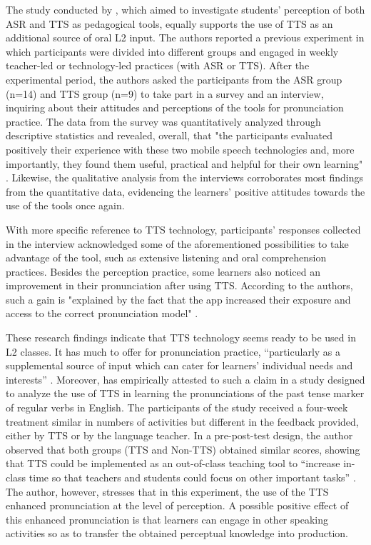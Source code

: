 \documentclass[english]{textolivre}
\begin{document}
The study conducted by \textcite{liakin_mobilizing_2017}, which aimed to investigate students' perception of both ASR and TTS as pedagogical tools, equally supports the use of TTS as an additional source of oral L2 input. The authors reported a previous experiment in which participants were divided into different groups and engaged in weekly teacher-led or technology-led practices (with ASR or TTS). After the experimental period, the authors asked the participants from the ASR group (n=14) and TTS group (n=9) to take part in a survey and an interview, inquiring about their attitudes and perceptions of the tools for pronunciation practice. The data from the survey was quantitatively analyzed through descriptive statistics and revealed, overall, that "the participants evaluated positively their experience with these two mobile speech technologies and, more importantly, they found them useful, practical and helpful for their own learning" \cite[p. 21]{liakin_mobilizing_2017}. Likewise, the qualitative analysis from the interviews corroborates most findings from the quantitative data, evidencing the learners' positive attitudes towards the use of the tools once again.

With more specific reference to TTS technology, participants' responses collected in the interview acknowledged some of the aforementioned possibilities to take advantage of the tool, such as extensive listening and oral comprehension practices. Besides the perception practice, some learners also noticed an improvement in their pronunciation after using TTS. According to the authors, such a gain is "explained by the fact that the app increased their exposure and access to the correct pronunciation model" \cite[p. 24]{liakin_mobilizing_2017}.

These research findings indicate that TTS technology seems ready to be used in L2 classes. It has much to offer for pronunciation practice, “particularly as a supplemental source of input which can cater for learners’ individual needs and interests” \cite[p. 112]{cardoso_2018}. Moreover, \textcite{cardoso_2018} has empirically attested to such a claim in a study designed to analyze the use of TTS in learning the pronunciations of the past tense marker of regular verbs in English. The participants of the study received a four-week treatment similar in numbers of activities but different in the feedback provided, either by TTS or by the language teacher. In a pre-post-test design, the author observed that both groups (TTS and Non-TTS) obtained similar scores, showing that TTS could be implemented as an out-of-class teaching tool to “increase in-class time so that teachers and students could focus on other important tasks” \cite[p. 21]{cardoso_evaluating_2015}. The author, however, stresses that in this experiment, the use of the TTS enhanced pronunciation at the level of perception. A possible positive effect of this enhanced pronunciation is that learners can engage in other speaking activities so as to transfer the obtained perceptual knowledge into production.
\end{document}
